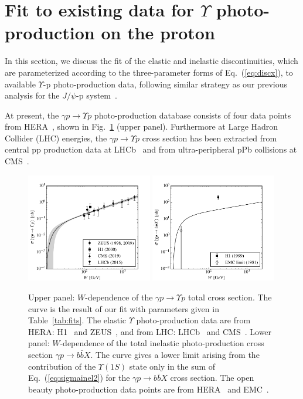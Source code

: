 \documentclass[prd,amsmath,%
twocolumn,floatfix,amssymb, preprintnumbers, linenumbers,nofootinbib, superscriptaddress]{revtex4}
\begin{document}
\section{Fit to existing data for $\Upsilon$ photo-production on the proton}


In this section, we discuss the fit of the elastic and inelastic discontinuities, which are parameterized according to the three-parameter forms of Eq.~(\ref{eq:discx}), to available  $\Upsilon$-p photo-production data, following similar strategy as our previous analysis for 
the $J/\psi$-p system~\cite{Gryniuk:2016mpk}. 
 
At present, the $\gamma p \to \Upsilon p$ photo-production database consists of four data points from HERA~\cite{Adloff:2000vm,Breitweg:1998ki,Chekanov:2009zz}, shown in Fig.~\ref{fig:sigmatot} 
(upper panel). 
Furthermore at Large Hadron Collider (LHC) energies, the $\gamma p \to \Upsilon p$ cross section has been extracted from central pp production data at LHCb~\cite{Aaij:2015kea} 
and from ultra-peripheral pPb collisions at  CMS~\cite{Sirunyan:2018sav}.

\begin{figure}[h]
\includegraphics[width=0.49\textwidth]{si_y.pdf}
\includegraphics[width=0.49\textwidth]{si_bbX.pdf}
\caption{Upper panel: $W$-dependence of the $\gamma p \to \Upsilon p$ total cross section.
The curve is the result of our fit with parameters given in Table~\ref{tab:fits}.
The elastic $\Upsilon$ photo-production data are from HERA: H1~\cite{Adloff:2000vm}
and ZEUS~\cite{Breitweg:1998ki, Chekanov:2009zz}, and from LHC: LHCb~\cite{Aaij:2015kea} 
and CMS~\cite{Sirunyan:2018sav}. 
Lower panel: $W$-dependence of the 
total inelastic photo-production cross section $\gamma p \to b \bar b X$.
The curve gives a lower limit arising from the contribution of the $\Upsilon(1S)$ state only in the sum of Eq.~(\ref{eq:sigmainel2}) for the $\gamma p \to b \bar b X$ cross section. 
The open beauty photo-production data points are from HERA~\cite{Adloff:1999nr} and EMC~\cite{Aubert:1981gx}.}
\label{fig:sigmatot}
\end{figure}
\end{document}
